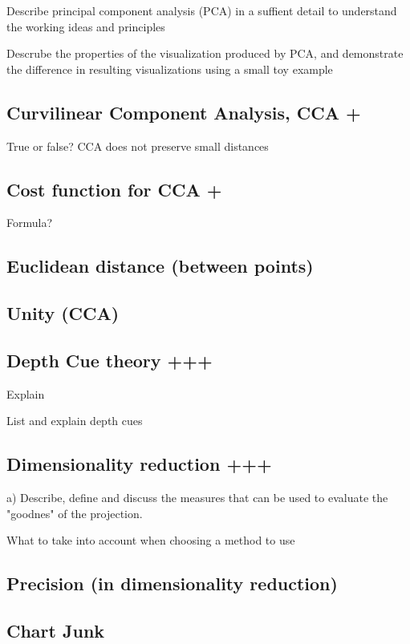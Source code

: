 \documentclass[a4paper]{article}
\begin{document}
Describe principal component analysis (PCA) in a suffient detail to understand the working ideas and principles

Descrube the properties of the visualization produced by PCA, and demonstrate the difference in resulting visualizations using a small toy example

\subsection{Curvilinear Component Analysis, CCA +}

True or false? CCA does not preserve small distances

\subsection{Cost function for CCA +}

Formula?

\subsection{Euclidean distance (between points)}

\subsection{Unity (CCA)}

\subsection{Depth Cue theory +++}
Explain

List and explain depth cues

\subsection{Dimensionality reduction +++}

a) Describe, define and discuss the measures that can be used to evaluate the "goodnes" of the projection.

What to take into account when choosing a method to use

\subsection{Precision (in dimensionality reduction)}

\subsection{Chart Junk}
\end{document}

